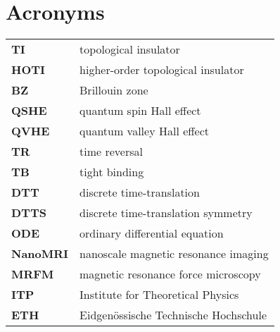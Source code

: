 
\chapter*{Acronyms}

\begin{tabularx}{\textwidth}{>{\bfseries}lX}
TI	&	topological insulator \\
HOTI & higher-order topological insulator \\
BZ	&	Brillouin zone \\
QSHE & quantum spin Hall effect \\
QVHE	& quantum valley Hall effect \\
TR  &	time reversal \\
TB	&	tight binding \\
DTT			& discrete time-translation \\
DTTS		& discrete time-translation symmetry \\
ODE				& ordinary differential equation \\
NanoMRI	& nanoscale magnetic resonance imaging \\
MRFM	& magnetic resonance force microscopy \\
ITP 			& Institute for Theoretical Physics \\
ETH 			& Eidgenössische Technische Hochschule \\
\end{tabularx}